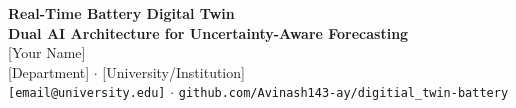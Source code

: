 \documentclass[final,a0paper,portrait]{a0poster}
\begin{document}
\pagestyle{empty}

\begin{center}
{\VERYHuge\textbf{\textcolor{primaryblue}{Real-Time Battery Digital Twin}}}\\[0.5cm]
{\Huge\textbf{Dual AI Architecture for Uncertainty-Aware Forecasting}}\\[1cm]
{\LARGE [Your Name] \quad [Co-authors]}\\[0.3cm]
{\Large [Department] $\cdot$ [University/Institution]}\\[0.5cm]
{\large \texttt{[email@university.edu]} $\cdot$ \texttt{github.com/Avinash143-ay/digitial\_twin-battery}}
\end{center}

\vspace{1cm}
\end{document}
